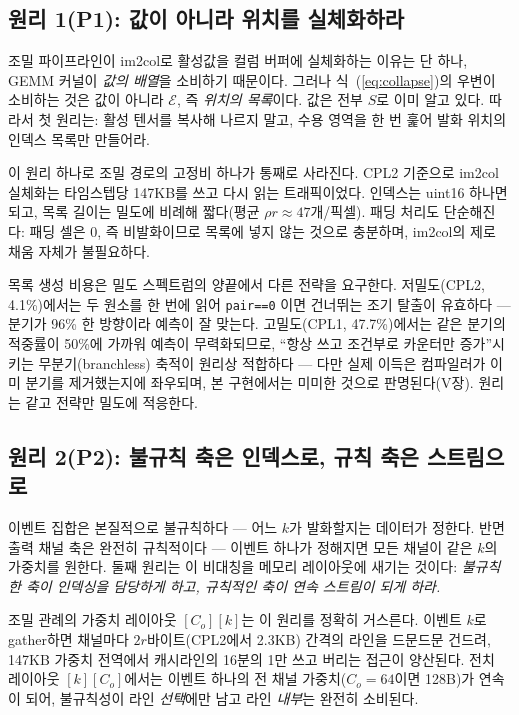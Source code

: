 \subsection{원리 1(P1): 값이 아니라 위치를 실체화하라}\label{sec:p1}

조밀 파이프라인이 im2col로 활성값을 컬럼 버퍼에 실체화하는 이유는
단 하나, GEMM 커널이 \emph{값의 배열}을 소비하기 때문이다. 그러나
식~(\ref{eq:collapse})의 우변이 소비하는 것은 값이 아니라
$\mathcal{E}$, 즉 \emph{위치의 목록}이다. 값은 전부 $S$로 이미 알고
있다. 따라서 첫 원리는: 활성 텐서를 복사해 나르지 말고, 수용 영역을
한 번 훑어 발화 위치의 인덱스 목록만 만들어라.

이 원리 하나로 조밀 경로의 고정비 하나가 통째로 사라진다. CPL2
기준으로 im2col 실체화는 타임스텝당 147KB를 쓰고 다시 읽는
트래픽이었다. 인덱스는 uint16 하나면 되고, 목록 길이는 밀도에
비례해 짧다(평균 $\rho r\approx47$개/픽셀). 패딩 처리도 단순해진다:
패딩 셀은 0, 즉 비발화이므로 목록에 넣지 않는 것으로 충분하며,
im2col의 제로 채움 자체가 불필요하다.

목록 생성 비용은 밀도 스펙트럼의 양끝에서 다른 전략을 요구한다.
저밀도(CPL2, 4.1\%)에서는 두 원소를 한 번에 읽어 \texttt{pair==0}
이면 건너뛰는 조기 탈출이 유효하다 --- 분기가 96\% 한 방향이라 예측이
잘 맞는다. 고밀도(CPL1, 47.7\%)에서는 같은 분기의 적중률이 50\%에
가까워 예측이 무력화되므로, ``항상 쓰고 조건부로 카운터만
증가''시키는 무분기(branchless) 축적이 원리상 적합하다 --- 다만 실제
이득은 컴파일러가 이미 분기를 제거했는지에 좌우되며, 본 구현에서는
미미한 것으로 판명된다(V장). 원리는 같고 전략만 밀도에 적응한다.

\subsection{원리 2(P2): 불규칙 축은 인덱스로, 규칙 축은 스트림으로}\label{sec:p2}

이벤트 집합은 본질적으로 불규칙하다 --- 어느 $k$가 발화할지는
데이터가 정한다. 반면 출력 채널 축은 완전히 규칙적이다 --- 이벤트
하나가 정해지면 모든 채널이 같은 $k$의 가중치를 원한다. 둘째
원리는 이 비대칭을 메모리 레이아웃에 새기는 것이다: \emph{불규칙한
축이 인덱싱을 담당하게 하고, 규칙적인 축이 연속 스트림이 되게
하라.}

조밀 관례의 가중치 레이아웃 $[C_o][k]$는 이 원리를 정확히
거스른다. 이벤트 $k$로 gather하면 채널마다 $2r$바이트(CPL2에서
2.3KB) 간격의 라인을 드문드문 건드려, 147KB 가중치 전역에서
캐시라인의 16분의 1만 쓰고 버리는 접근이 양산된다. 전치 레이아웃
$[k][C_o]$에서는 이벤트 하나의 전 채널 가중치($C_o{=}64$이면
128B)가 연속이 되어, 불규칙성이 라인 \emph{선택}에만 남고 라인
\emph{내부}는 완전히 소비된다.

